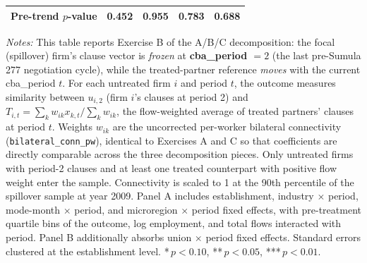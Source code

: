 \begin{table}[H]
\begin{tabular}{lcccc}
Pre-trend $p$-value & 0.452 & 0.955 & 0.783 & 0.688 \\
\hline\hline
\end{tabular}
\begin{minipage}{\linewidth}
\smallskip
\scriptsize\textit{Notes:} This table reports Exercise B of the A/B/C decomposition: the focal (spillover) firm's clause vector is \emph{frozen} at \textbf{cba\_period $= 2$} (the last pre-Sumula 277 negotiation cycle), while the treated-partner reference \emph{moves} with the current cba\_period $t$. For each untreated firm $i$ and period $t$, the outcome measures similarity between $u_{i,2}$ (firm $i$'s clauses at period 2) and $T_{i,t} = \sum_k w_{ik} x_{k,t} / \sum_k w_{ik}$, the flow-weighted average of treated partners' clauses at period $t$. Weights $w_{ik}$ are the uncorrected per-worker bilateral connectivity (\texttt{bilateral\_conn\_pw}), identical to Exercises A and C so that coefficients are directly comparable across the three decomposition pieces. Only untreated firms with period-2 clauses and at least one treated counterpart with positive flow weight enter the sample. Connectivity is scaled to 1 at the 90th percentile of the spillover sample at year 2009. Panel A includes establishment, industry $\times$ period, mode-month $\times$ period, and microregion $\times$ period fixed effects, with pre-treatment quartile bins of the outcome, log employment, and total flows interacted with period. Panel B additionally absorbs union $\times$ period fixed effects. Standard errors clustered at the establishment level. *\,$p<0.10$, **\,$p<0.05$, ***\,$p<0.01$.
\end{minipage}
\end{table}
